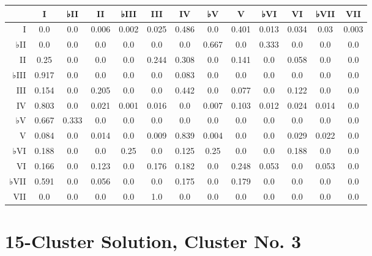 \begin{table}[htbp]
\begin{minipage}{\linewidth}
\setlength{\tymax}{0.5\linewidth}
\centering
\small
\begin{tabulary}{\textwidth}{@{}RCCCCCCCCCCCC@{}} \toprule
&I&♭II&II&♭III&III&IV&♭V&V&♭VI&VI&♭VII&VII\\
\midrule
I&0.0&0.0&0.006&0.002&0.025&0.486&0.0&0.401&0.013&0.034&0.03&0.003\\
♭II&0.0&0.0&0.0&0.0&0.0&0.0&0.667&0.0&0.333&0.0&0.0&0.0\\
II&0.25&0.0&0.0&0.0&0.244&0.308&0.0&0.141&0.0&0.058&0.0&0.0\\
♭III&0.917&0.0&0.0&0.0&0.0&0.083&0.0&0.0&0.0&0.0&0.0&0.0\\
III&0.154&0.0&0.205&0.0&0.0&0.442&0.0&0.077&0.0&0.122&0.0&0.0\\
IV&0.803&0.0&0.021&0.001&0.016&0.0&0.007&0.103&0.012&0.024&0.014&0.0\\
♭V&0.667&0.333&0.0&0.0&0.0&0.0&0.0&0.0&0.0&0.0&0.0&0.0\\
V&0.084&0.0&0.014&0.0&0.009&0.839&0.004&0.0&0.0&0.029&0.022&0.0\\
♭VI&0.188&0.0&0.0&0.25&0.0&0.125&0.25&0.0&0.0&0.188&0.0&0.0\\
VI&0.166&0.0&0.123&0.0&0.176&0.182&0.0&0.248&0.053&0.0&0.053&0.0\\
♭VII&0.591&0.0&0.056&0.0&0.0&0.175&0.0&0.179&0.0&0.0&0.0&0.0\\
VII&0.0&0.0&0.0&0.0&1.0&0.0&0.0&0.0&0.0&0.0&0.0&0.0\\

\bottomrule

\end{tabulary}
\end{minipage}
\end{table}

\section{15-Cluster Solution, Cluster No. 3}
\label{15-clustersolutionclusterno.3}


